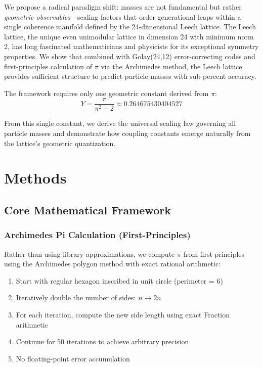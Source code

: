 \documentclass[11pt]{article}
\begin{document}
We propose a radical paradigm shift: masses are not fundamental but rather \textit{geometric observables}---scaling factors that order generational leaps within a single coherence manifold defined by the 24-dimensional Leech lattice. The Leech lattice, the unique even unimodular lattice in dimension 24 with minimum norm 2, has long fascinated mathematicians and physicists for its exceptional symmetry properties. We show that combined with Golay(24,12) error-correcting codes and first-principles calculation of $\pi$ via the Archimedes method, the Leech lattice provides sufficient structure to predict particle masses with sub-percent accuracy.

The framework requires only one geometric constant derived from $\pi$:
\begin{equation}
Y = \frac{\pi}{\pi^2 + 2} \approx 0.264675430404527
\end{equation}

From this single constant, we derive the universal scaling law governing all particle masses and demonstrate how coupling constants emerge naturally from the lattice's geometric quantization.

\section{Methods}

\subsection{Core Mathematical Framework}

\subsubsection{Archimedes Pi Calculation (First-Principles)}

Rather than using library approximations, we compute $\pi$ from first principles using the Archimedes polygon method with exact rational arithmetic:

\begin{enumerate}
\item Start with regular hexagon inscribed in unit circle (perimeter = 6)
\item Iteratively double the number of sides: $n \to 2n$
\item For each iteration, compute the new side length using exact Fraction arithmetic
\item Continue for 50 iterations to achieve arbitrary precision
\item No floating-point error accumulation
\end{enumerate}
\end{document}
